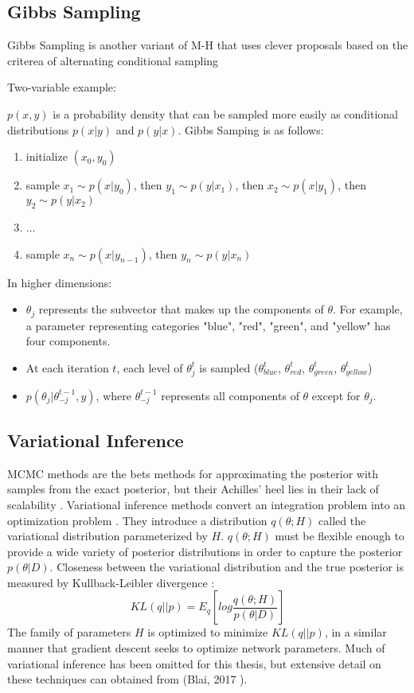 \subsection{Gibbs Sampling}

Gibbs Sampling is another variant of M-H that uses clever proposals based on the criterea of alternating conditional sampling

Two-variable example: \cite{geman1984stochastic}  

$p(x,y)$ is a probability density that can be sampled more easily as conditional distributions $p(x|y)$ and $p(y|x)$.  Gibbs Samping is as follows:
\begin{enumerate}
\item{initialize $(x_0,y_0)$}
\item{sample $x_1 \sim p(x|y_0)$, then $y_1 \sim p(y|x_1)$, then $x_2 \sim p(x|y_1)$, then $y_2 \sim p(y|x_2)$}
\item{ ...}
\item{sample $x_n \sim p(x|y_{n-1})$, then $y_n \sim p(y|x_n)$}
\end{enumerate}

In higher dimensions:

\begin{itemize}
\tightlist
\item{$\theta_j$ represents the subvector that makes up the components of $\theta$.  For example, a parameter representing categories "blue", "red", "green", and "yellow" has four components.}
\item{At each iteration $t$, each level of $\theta^t_j$ is sampled ($\theta^t_{blue}$, $\theta^t_{red}$, $\theta^t_{green}$, $\theta^t_{yellow}$)}
\item{ $p(\theta_j|\theta^{t-1}_{-j},y)$, where $\theta^{t-1}_{-j}$ represents all components of $\theta$ except for $\theta_j$.}
\end{itemize}



\subsection{Variational Inference}

MCMC methods are the bets methods for approximating the posterior with samples from the exact posterior, but their Achilles' heel lies in their lack of scalability \cite{Jospin}.  Variational inference methods convert an integration problem into an optimization problem \cite{mullachery2018bayesian}.  They introduce a distribution $q(\theta;H)$ called the variational distribution parameterized by $H$.  $q(\theta;H)$ must be flexible enough to provide a wide variety of posterior distributions in order to capture the posterior $p(\theta|D)$.  Closeness between the variational distribution and the true posterior is measured by Kullback-Leibler divergence \cite{blei2017variational}:
$$
KL(q||p) = E_q\left[ log\frac{q(\theta;H)}{p(\theta|D)} \right]
$$
The family of parameters $H$ is optimized to minimize $KL(q||p)$, in a similar manner that gradient descent seeks to optimize network parameters.  Much of variational inference has been omitted for this thesis, but extensive detail on these techniques can obtained from (Blai, 2017 \cite{blei2017variational}).


